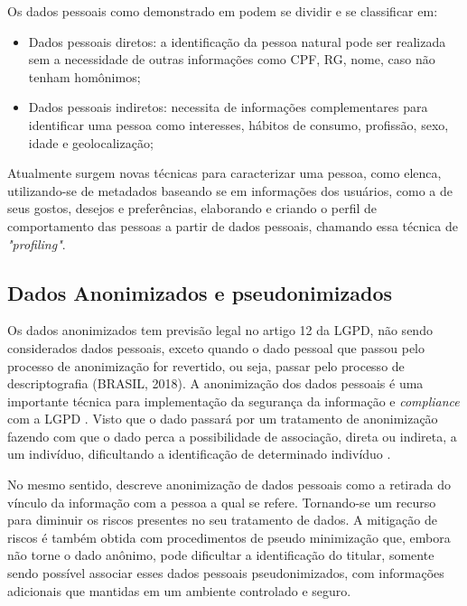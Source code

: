 \documentclass[
	12pt,				%
	openright,			%
	oneside,			%
	a4paper,			%
	english,			%
	french,				%
	spanish,			%
	brazil,				%
	]{abntex2}
\begin{document}
Os dados pessoais como demonstrado em \cite{02-01-Vainzof2020} podem se dividir e se classificar em:
\begin{itemize}
\item Dados pessoais diretos: a identificação da pessoa natural pode ser realizada sem a necessidade de outras informações como CPF, RG, nome, caso não tenham homônimos;
\item Dados pessoais indiretos: necessita de informações complementares para identificar uma pessoa como interesses, hábitos de consumo, profissão, sexo, idade e geolocalização;
\end{itemize}

Atualmente surgem novas técnicas para caracterizar uma pessoa, como elenca,  utilizando-se de metadados baseando se em informações dos usuários, como a de seus gostos, desejos e preferências, elaborando e criando o perfil de comportamento das pessoas a partir de dados pessoais, chamando essa técnica de \textit{"profiling"}.

\subsection{Dados Anonimizados e pseudonimizados}

Os dados anonimizados tem previsão legal no artigo 12 da LGPD, não sendo considerados dados pessoais, exceto quando o dado pessoal que passou pelo processo de anonimização for revertido, ou seja, passar pelo processo de descriptografia  (BRASIL, 2018). A anonimização dos dados pessoais é uma importante técnica para implementação da segurança da informação e \textit{compliance} com a LGPD \cite{02-01-Maroso2020}. Visto que o dado passará por um tratamento de anonimização fazendo com que o dado perca a possibilidade de associação, direta ou indireta, a um indivíduo, dificultando a identificação de determinado indivíduo \cite{Pinheiro2018}.

No mesmo sentido,  descreve anonimização de dados pessoais como a retirada do vínculo da informação com a pessoa a qual se refere. Tornando-se um recurso para diminuir os riscos presentes no seu tratamento de dados. A mitigação de riscos é também obtida com procedimentos de pseudo minimização que, embora não torne o dado anônimo, pode dificultar a identificação do titular, somente sendo possível associar esses dados pessoais pseudonimizados, com informações adicionais que mantidas em um ambiente controlado e seguro.
\end{document}
